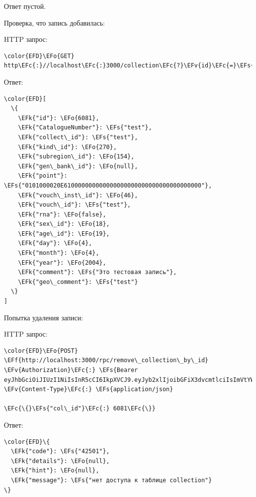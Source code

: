 \documentclass[14pt]{extarticle}
\newcommand{\EFc}[1]{\textcolor{EFc}{#1}} %
\newcommand{\EFs}[1]{\textcolor{EFs}{#1}} %
\newcommand{\EFk}[1]{\textcolor{EFk}{#1}} %
\newcommand{\EFf}[1]{\textcolor{EFf}{#1}} %
\newcommand{\EFv}[1]{\textcolor{EFv}{#1}} %
\newcommand{\EFo}[1]{\textcolor{EFo}{#1}} %
\begin{document}
Ответ пустой.

Проверка, что запись добавилась:

HTTP запрос:
\begin{Code}
\begin{Verbatim}
\color{EFD}\EFo{GET} http\EFc{:}//localhost\EFc{:}3000/collection\EFc{?}\EFv{id}\EFc{=}\EFs{eq.6081}
\end{Verbatim}
\end{Code}


Ответ:
\begin{Code}
\begin{Verbatim}
\color{EFD}[
  \{
    \EFk{"id"}: \EFo{6081},
    \EFk{"CatalogueNumber"}: \EFs{"test"},
    \EFk{"collect\_id"}: \EFs{"test"},
    \EFk{"kind\_id"}: \EFo{270},
    \EFk{"subregion\_id"}: \EFo{154},
    \EFk{"gen\_bank\_id"}: \EFo{null},
    \EFk{"point"}: \EFs{"0101000020E610000000000000000000000000000000000000"},
    \EFk{"vouch\_inst\_id"}: \EFo{46},
    \EFk{"vouch\_id"}: \EFs{"test"},
    \EFk{"rna"}: \EFo{false},
    \EFk{"sex\_id"}: \EFo{18},
    \EFk{"age\_id"}: \EFo{19},
    \EFk{"day"}: \EFo{4},
    \EFk{"month"}: \EFo{4},
    \EFk{"year"}: \EFo{2004},
    \EFk{"comment"}: \EFs{"Это тестовая запись"},
    \EFk{"geo\_comment"}: \EFs{"test"}
  \}
]
\end{Verbatim}
\end{Code}

Попытка удаления записи:

HTTP запрос:
\begin{Code}
\begin{Verbatim}
\color{EFD}\EFo{POST} \EFf{http://localhost:3000/rpc/remove\_collection\_by\_id}
\EFv{Authorization}\EFc{:} \EFs{Bearer eyJhbGciOiJIUzI1NiIsInR5cCI6IkpXVCJ9.eyJyb2xlIjoibGFiX3dvcmtlciIsImVtYWlsIjoidGVzdEB0ZXN0LmNvbSIsImV4cCI6MTY4Mjk1NzI1N30.YaqxuxgQeeZPTQBppSYg154FDUPlrTh8WhgDvgEd5sQ}
\EFv{Content-Type}\EFc{:} \EFs{application/json}

\EFc{\{}\EFs{"col\_id"}\EFc{:} 6081\EFc{\}}

\end{Verbatim}
\end{Code}

Ответ:
\begin{Code}
\begin{Verbatim}
\color{EFD}\{
  \EFk{"code"}: \EFs{"42501"},
  \EFk{"details"}: \EFo{null},
  \EFk{"hint"}: \EFo{null},
  \EFk{"message"}: \EFs{"нет доступа к таблице collection"}
\}
\end{Verbatim}
\end{Code}
\end{document}
